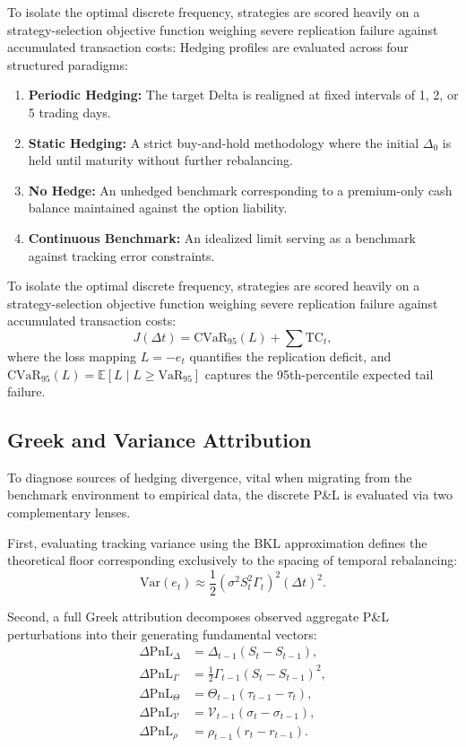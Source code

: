\documentclass{article}
\begin{document}
To isolate the optimal discrete frequency, strategies are scored heavily on a strategy-selection objective function weighing severe replication failure against accumulated transaction costs:
Hedging profiles are evaluated across four structured paradigms:
\begin{enumerate}
    \item \textbf{Periodic Hedging:} The target Delta is realigned at fixed intervals of 1, 2, or 5 trading days.
    \item \textbf{Static Hedging:} A strict buy-and-hold methodology where the initial $\Delta_0$ is held until maturity without further rebalancing.
    \item \textbf{No Hedge:} An unhedged benchmark corresponding to a premium-only cash balance maintained against the option liability.
    \item \textbf{Continuous Benchmark:} An idealized limit serving as a benchmark against tracking error constraints.
\end{enumerate}

To isolate the optimal discrete frequency, strategies are scored heavily on a strategy-selection objective function weighing severe replication failure against accumulated transaction costs:
\[
J(\Delta t) = \text{CVaR}_{95}(L) + \sum \text{TC}_t,
\]
where the loss mapping $L = -e_t$ quantifies the replication deficit, and $\text{CVaR}_{95}(L) = \mathbb{E}[L \mid L \geq \text{VaR}_{95}]$ captures the 95th-percentile expected tail failure.

\subsection{Greek and Variance Attribution}

To diagnose sources of hedging divergence, vital when migrating from the benchmark environment to empirical data, the discrete P\&L is evaluated via two complementary lenses.

First, evaluating tracking variance using the BKL approximation defines the theoretical floor corresponding exclusively to the spacing of temporal rebalancing:
\[
\text{Var}(e_t) \approx \frac{1}{2} \left( \sigma^2 S_t^2 \Gamma_t \right)^2 (\Delta t)^2.
\]

Second, a full Greek attribution decomposes observed aggregate P\&L perturbations into their generating fundamental vectors:
\begin{align*}
\Delta \text{PnL}_{\Delta} &= \Delta_{t-1}(S_t - S_{t-1}), \\
\Delta \text{PnL}_{\Gamma} &= \frac{1}{2}\Gamma_{t-1}(S_t - S_{t-1})^2, \\
\Delta \text{PnL}_{\Theta} &= \Theta_{t-1}(\tau_{t-1} - \tau_t), \\
\Delta \text{PnL}_{\mathcal{V}} &= \mathcal{V}_{t-1}(\sigma_t - \sigma_{t-1}), \\
\Delta \text{PnL}_{\rho} &= \rho_{t-1}(r_t - r_{t-1}).
\end{align*}
\end{document}
